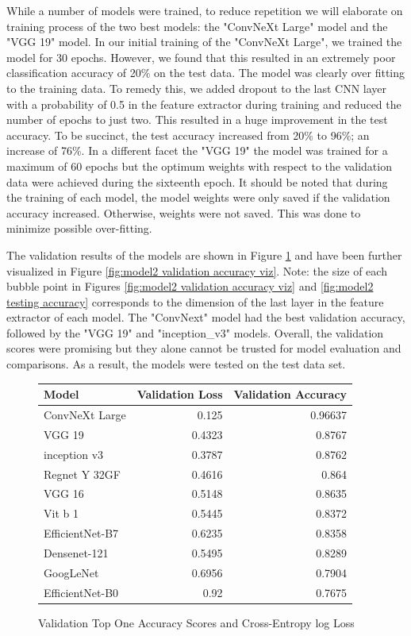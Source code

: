 \documentclass{article}
\begin{document}
While a number of models were trained, to reduce repetition we will elaborate on training process of the two best models: the "ConvNeXt Large" model and the "VGG 19" model.  In our initial training of the "ConvNeXt Large", we trained the model for 30 epochs.  However, we found that this resulted in an extremely poor classification accuracy of 20\% on the test data.  The model was clearly over fitting to the training data.  To remedy this, we added dropout to the last CNN layer with a probability of 0.5 in the feature extractor during training and reduced the number of epochs to just two.  This resulted in a huge improvement in the test accuracy.  To be succinct, the test accuracy increased from 20\% to 96\%; an increase of 76\%.  In a different facet the "VGG 19" the model was trained for a maximum of 60 epochs but the optimum weights with respect to the validation data were achieved during the sixteenth epoch.  It should be noted that during the training of each model, the model weights were only saved if the validation accuracy increased.  Otherwise, weights were not saved.  This was done to minimize possible over-fitting.

The validation results of the models are shown in Figure \ref{fig:model2-val-accuracy} and have been further visualized in Figure \ref{fig:model2 validation accuracy viz}.   Note: the size of each bubble point in Figures \ref{fig:model2 validation accuracy viz} and \ref{fig:model2 testing accuracy} corresponds to the dimension of the last layer in the feature extractor of each model.  The "ConvNext" model had the best validation accuracy, followed by the "VGG 19" and "inception\_v3" models. Overall, the validation scores were promising but they alone cannot be trusted for model evaluation and comparisons.  As a result, the models were tested on the test data set.

\begin{figure}[h]
\centering
\begin{tabular}{|l|r|r|}
\hline
\textbf{Model} & \multicolumn{1}{l|}{\textbf{Validation Loss}} & \multicolumn{1}{l|}{\textbf{Validation Accuracy}} \\ \hline
ConvNeXt Large   & 0.125  & 0.96637 \\ \hline
VGG 19         	& 0.4323 & 0.8767  \\ \hline
inception v3 	& 0.3787 & 0.8762  \\ \hline
Regnet Y 32GF   & 0.4616 & 0.864   \\ \hline
VGG 16         	& 0.5148 & 0.8635  \\ \hline
Vit b 1    	    & 0.5445 & 0.8372  \\ \hline
EfficientNet-B7  & 0.6235 & 0.8358  \\ \hline
Densenet-121      	& 0.5495 & 0.8289  \\ \hline
GoogLeNet       	& 0.6956 & 0.7904  \\ \hline
EfficientNet-B0  	& 0.92   & 0.7675  \\ \hline
\end{tabular}
\caption{Validation Top One Accuracy Scores and Cross-Entropy log Loss}
\label{fig:model2-val-accuracy}
\end{figure}
\end{document}
